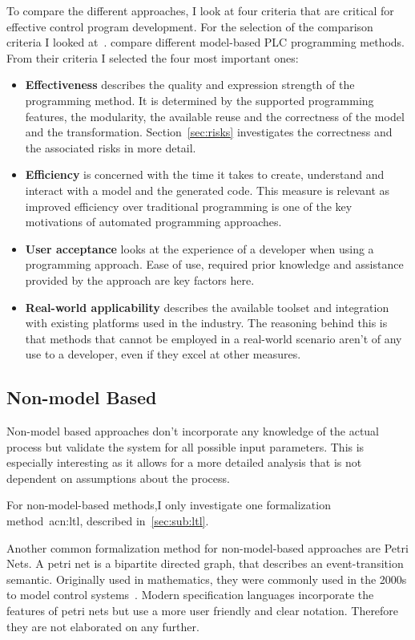 To compare the different approaches, I look at four criteria that are critical for effective control program development.
For the selection of the comparison criteria I looked at~\cite{VH:2014}.
\citeauthor{VH:2014} compare different model-based PLC programming methods.
From their criteria I selected the four most important ones:
\begin{itemize}
	\item \textbf{Effectiveness} describes the quality and expression strength of the programming method.
	It is determined by the supported programming features, the modularity, the available reuse and the correctness of the model and the transformation.
	Section~\ref{sec:risks} investigates the correctness and the associated risks in more detail.
	\item \textbf{Efficiency} is concerned with the time it takes to create, understand and interact with a model and the generated code.
	This measure is relevant as improved efficiency over traditional programming is one of the key motivations of automated programming approaches.
	\item \textbf{User acceptance} looks at the experience of a developer when using a programming approach.
	Ease of use, required prior knowledge and assistance provided by the approach are key factors here.
	\item \textbf{Real-world applicability} describes the available toolset and integration with existing platforms used in the industry.
	The reasoning behind this is that methods that cannot be employed in a real-world scenario aren't of any use to a developer, even if they excel at other measures.
\end{itemize}

\subsection{Non-model Based}
\label{sec:non_model}

Non-model based approaches don't incorporate any knowledge of the actual process but validate the system for all possible input parameters.
This is especially interesting as it allows for a more detailed analysis that is not dependent on assumptions about the process.

For non-model-based methods,I only investigate one formalization method~\acrlong{acn:ltl}, described in~\ref{sec:sub:ltl}.

Another common formalization method for non-model-based approaches are Petri Nets.
A petri net is a bipartite directed graph, that describes an event-transition semantic.
Originally used in mathematics, they were commonly used in the 2000s to model control systems~\cite{Frey:2000:2, Frey:2000aa}.
Modern specification languages incorporate the features of petri nets but use a more user friendly and clear notation.
Therefore they are not elaborated on any further.


